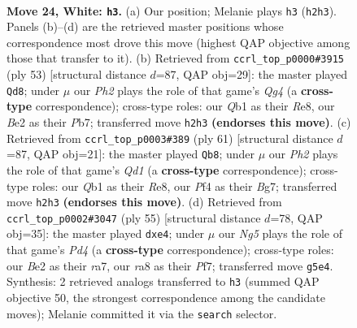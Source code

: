 \documentclass[11pt]{article}
\begin{document}
\clearpage

\begin{figure}[p]\centering
\begin{subfigure}{0.46\textwidth}\centering
\resizebox{\linewidth}{!}{%
\newchessgame
\chessboard[
  setfen={rn4r1/4k3/1p2p3/pPq1npN1/5P1p/8/P3B1PP/RQ2K2R w - - 2 24},
  showmover=false,
  pgfstyle=straightmove, color=movearrow, markmove={h2-h3}
]}
\caption{}
\end{subfigure}\hfill
\begin{subfigure}{0.46\textwidth}\centering
\resizebox{\linewidth}{!}{%
\newchessgame
\chessboard[
  setfen={4r1k1/1pp2p2/6pp/1P1r2q1/p2N1n2/P1Q3PP/R2N1P2/1R5K b - - 0 27},
  showmover=false,
  pgfstyle=straightmove, color=movearrow, markmove={g5-d8}
]}
\caption{}
\end{subfigure}
\\[4pt]
\begin{subfigure}{0.46\textwidth}\centering
\resizebox{\linewidth}{!}{%
\newchessgame
\chessboard[
  setfen={3qr1k1/3b1pb1/7p/1pQN2p1/1P1Np3/6P1/5PP1/3R2K1 b - - 3 31},
  showmover=false,
  pgfstyle=straightmove, color=movearrow, markmove={d8-b8}
]}
\caption{}
\end{subfigure}\hfill
\begin{subfigure}{0.46\textwidth}\centering
\resizebox{\linewidth}{!}{%
\newchessgame
\chessboard[
  setfen={4r1k1/R4pp1/1r2b1np/1pqp4/3NP3/3P1NQP/1P4P1/R6K b - - 0 28},
  showmover=false,
  pgfstyle=straightmove, color=movearrow, markmove={d5-e4}
]}
\caption{}
\end{subfigure}
\caption{\textbf{Move 24, White: \texttt{h3}.} (a) Our position; Melanie plays \texttt{h3} (\texttt{h2h3}). Panels (b)--(d) are the retrieved master positions whose correspondence most drove this move (highest QAP objective among those that transfer to it). (b) Retrieved from \texttt{ccrl\_top\_p0000\#3915} (ply 53) [structural distance $d$=87, QAP obj=29]: the master played \texttt{Qd8}; under $\mu$ our \emph{Ph2} plays the role of that game's \emph{Qg4} (a \textbf{cross-type} correspondence); cross-type roles: our \emph{Q}b1 as their \emph{R}e8, our \emph{B}e2 as their \emph{P}b7; transferred move \texttt{h2h3} \textbf{(endorses this move)}. (c) Retrieved from \texttt{ccrl\_top\_p0003\#389} (ply 61) [structural distance $d$=87, QAP obj=21]: the master played \texttt{Qb8}; under $\mu$ our \emph{Ph2} plays the role of that game's \emph{Qd1} (a \textbf{cross-type} correspondence); cross-type roles: our \emph{Q}b1 as their \emph{R}e8, our \emph{P}f4 as their \emph{B}g7; transferred move \texttt{h2h3} \textbf{(endorses this move)}. (d) Retrieved from \texttt{ccrl\_top\_p0002\#3047} (ply 55) [structural distance $d$=78, QAP obj=35]: the master played \texttt{dxe4}; under $\mu$ our \emph{Ng5} plays the role of that game's \emph{Pd4} (a \textbf{cross-type} correspondence); cross-type roles: our \emph{B}e2 as their \emph{r}a7, our \emph{r}a8 as their \emph{P}f7; transferred move \texttt{g5e4}. Synthesis: 2 retrieved analogs transferred to \texttt{h3} (summed QAP objective 50, the strongest correspondence among the candidate moves); Melanie committed it via the \texttt{search} selector.}
\label{fig:thought-m46}
\end{figure}
\end{document}
